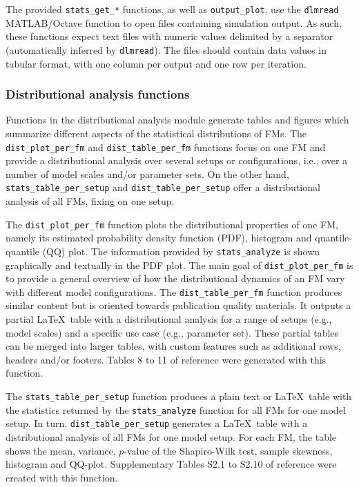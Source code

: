 \documentclass{article}
\newcommand{\progfunc}{\textnhtt}
\begin{document}
The provided \progfunc{stats\_get\_*} functions, as well as \progfunc{output\_plot}, use the \progfunc{dlmread} MATLAB/Octave function to open files containing simulation output. As such, these functions expect text files with numeric values delimited by a separator (automatically inferred by \progfunc{dlmread}). The files should contain data values in tabular format, with one column per output and one row per iteration.

\subsubsection*{Distributional analysis functions}

Functions in the distributional analysis module generate tables and figures which summarize different aspects of the statistical distributions of FMs. The  \progfunc{dist\_plot\_per\_fm} and \progfunc{dist\_table\_per\_fm} functions focus on one FM and provide a distributional analysis over several setups or configurations, i.e., over a number of model scales and/or parameter sets. On the other hand, \progfunc{stats\_table\_per\_setup} and \progfunc{dist\_table\_per\_setup} offer a distributional analysis of all FMs, fixing on one setup.

The \progfunc{dist\_plot\_per\_fm} function plots the distributional properties of one FM, namely its estimated probability density function (PDF), histogram and quantile-quantile (QQ) plot. The information provided by \progfunc{stats\_analyze} is shown graphically and textually in the PDF plot. The main goal of \progfunc{dist\_plot\_per\_fm} is to provide a general overview of how the distributional dynamics of an FM vary with different model configurations. The \progfunc{dist\_table\_per\_fm} function produces similar content but is oriented towards publication quality materials. It outputs a partial \LaTeX\ table with a distributional analysis for a range of setups (e.g., model scales) and a specific use case (e.g., parameter set). These partial tables can be merged into larger tables, with custom features such as additional rows, headers and/or footers. Tables 8 to 11 of reference \cite{fachada2015template} were generated with this function.

The \progfunc{stats\_table\_per\_setup} function produces a plain text or \LaTeX\ table with the statistics returned by the \progfunc{stats\_analyze} function for all FMs for one model setup. In turn, \progfunc{dist\_table\_per\_setup} generates a \LaTeX\ table with a distributional analysis of all FMs for one model setup. For each FM, the table shows the mean, variance, $p$-value of the Shapiro-Wilk test, sample skewness, histogram and QQ-plot. Supplementary Tables S2.1 to S2.10 of reference \cite{fachada2015template} were created with this function.
\end{document}
